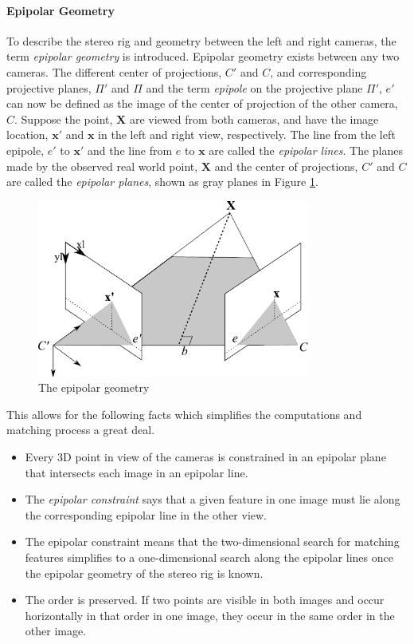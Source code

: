 \paragraph{Epipolar Geometry}
To describe the stereo rig and geometry between the left and right cameras, the term
\emph{epipolar geometry} is introduced. Epipolar geometry exists between any two cameras.
The different center of projections, $C'$ and $C$, and corresponding
projective planes, $\Pi'$ and $\Pi$ and the term \emph{epipole} on the projective plane
$\Pi'$, $e'$ can now be defined as the image of the center of projection of the other 
camera, $C$. Suppose the point, $\mathbf{X}$ are viewed from both cameras, and have the image
location, $\mathbf{x'}$ and $\mathbf{x}$ in the left and right view, respectively. The line from the left
epipole, $e'$ to $\mathbf{x'}$ and the line from $e$ to $\mathbf{x}$ are called the \emph{epipolar
lines}. The planes made by the observed real world point, $\mathbf{X}$ and the center of
projections, $C'$ and $C$ are called the \emph{epipolar planes}, shown as gray planes in Figure
\ref{chap2:fig-epipolarGeometry}.
\begin{figure}[htbp]
    \centering
    \includegraphics[width=0.8\textwidth]{pics/epipolar}
    \caption{The epipolar geometry}
    \label{chap2:fig-epipolarGeometry}
\end{figure}

This allows for the following facts which simplifies the computations and matching process
a great deal. 
\cite{epipolar}
\begin{itemize}
    \item Every 3D point in view of the cameras is constrained in an epipolar plane that
        intersects each image in an epipolar line.
    \item The \emph{epipolar constraint} says that a given feature in one image must lie
        along the corresponding epipolar line in the other view.
    \item The epipolar constraint means that the two-dimensional search for matching
        features simplifies to a one-dimensional search along the epipolar lines once the
        epipolar geometry of the stereo rig is known.
    \item The order is preserved. If two points are visible in both images and occur
        horizontally in that order in one image, they occur in the same order in the other
        image.
\end{itemize}


